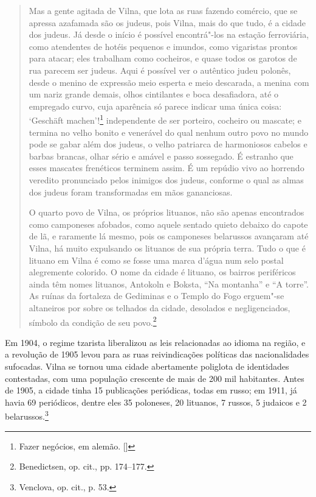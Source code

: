 \begin{quote}
Mas a gente agitada de Vilna, que lota as ruas fazendo comércio, que se
apressa azafamada são os judeus, pois Vilna, mais do que tudo, é a
cidade dos judeus. Já desde o início é possível encontrá"-los na estação
ferroviária, como atendentes de hotéis pequenos e imundos, como
vigaristas prontos para atacar; eles trabalham como cocheiros, e quase
todos os garotos de rua parecem ser judeus. Aqui é possível ver o
autêntico judeu polonês, desde o menino de expressão meio esperta e meio
descarada, a menina com um nariz grande demais, olhos cintilantes e boca
desafiadora, até o empregado curvo, cuja aparência só parece indicar uma
única coisa: `Geschäft machen'!\footnote{Fazer negócios, em alemão. []}
independente de ser porteiro, cocheiro ou mascate; e termina no velho
bonito e venerável do qual nenhum outro povo no mundo pode se gabar além
dos judeus, o velho patriarca de harmoniosos cabelos e barbas brancas,
olhar sério e amável e passo sossegado. É estranho que esses mascates
frenéticos terminem assim. É um repúdio vivo ao horrendo veredito
pronunciado pelos inimigos dos judeus, conforme o qual as almas dos
judeus foram transformadas em mãos gananciosas.

O quarto povo de Vilna, os próprios lituanos, não são apenas encontrados
como camponeses afobados, como aquele sentado quieto debaixo do capote
de lã, e raramente lá mesmo, pois os camponeses belarussos avançaram até
Vilna, há muito expulsando os lituanos de sua própria terra. Tudo o que
é lituano em Vilna é como se fosse uma marca d'água num selo postal
alegremente colorido. O nome da cidade é lituano, os bairros periféricos
ainda têm nomes lituanos, Antokoln e Boksta, ``Na montanha'' e ``A
torre''. As ruínas da fortaleza de Gediminas e o Templo do Fogo
erguem"-se altaneiros por sobre os telhados da cidade, desolados e
negligenciados, símbolo da condição de seu povo.\footnote{Benedictsen,
  op. cit., pp. 174--177.}
\end{quote}

Em 1904, o regime tzarista liberalizou as leis relacionadas ao idioma na
região, e a revolução de 1905 levou para as ruas reivindicações
políticas das nacionalidades sufocadas. Vilna se tornou uma cidade
abertamente poliglota de identidades contestadas, com uma população
crescente de mais de 200 mil habitantes. Antes de 1905, a cidade tinha
15 publicações periódicas, todas em russo; em 1911, já havia 69
periódicos, dentre eles 35 poloneses, 20 lituanos, 7 russos, 5 judaicos
e 2 belarussos.\footnote{Venclova, op. cit., p. 53.}

